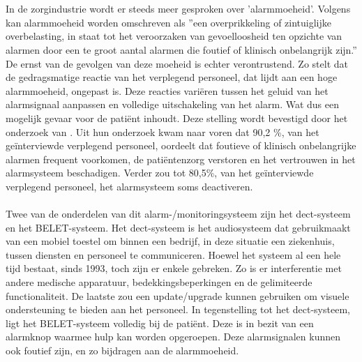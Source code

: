 
\chapter{}%
\label{ch:inleiding}


\section{}%
\label{sec:probleemstelling}

In de zorgindustrie wordt er steeds meer gesproken over 'alarmmoeheid'. Volgens \textcite{Ferrara2023} kan alarmmoeheid worden omschreven als ''een overprikkeling of zintuiglijke overbelasting, in staat tot het veroorzaken van gevoelloosheid ten opzichte van alarmen door een te groot aantal alarmen die foutief of klinisch onbelangrijk zijn.'' De ernst van de gevolgen van deze moeheid is echter verontrustend. Zo stelt \textcite{Ferrara2023} dat de gedragsmatige reactie van het verplegend personeel, dat lijdt aan een hoge alarmmoeheid, ongepast is. Deze reacties variëren tussen het geluid van het alarmsignaal aanpassen en volledige uitschakeling van het alarm. Wat dus een mogelijk gevaar voor de patiënt inhoudt. Deze stelling wordt bevestigd door het onderzoek van \textcite{Casey2018}. Uit hun onderzoek kwam naar voren dat 90,2 \%, van het geïnterviewde verplegend personeel, oordeelt dat foutieve of klinisch onbelangrijke alarmen frequent voorkomen, de patiëntenzorg verstoren en het vertrouwen in het alarmsysteem beschadigen. Verder zou tot 80,5\%, van het geïnterviewde verplegend personeel, het alarmsysteem soms deactiveren.
\\\\
Twee van de onderdelen van dit alarm-/monitoringsysteem zijn het \gls{dect}-systeem en het BELET-systeem. Het \gls{dect}-systeem is het audiosysteem dat gebruikmaakt van een mobiel toestel om binnen een bedrijf, in deze situatie een ziekenhuis, tussen diensten en personeel te communiceren. Hoewel het systeem al een hele tijd bestaat, sinds 1993, toch zijn er enkele gebreken. Zo is er interferentie met andere medische apparatuur, bedekkingsbeperkingen en de gelimiteerde functionaliteit. De laatste zou een update/upgrade kunnen gebruiken om visuele ondersteuning te bieden aan het personeel.
In tegenstelling tot het \gls{dect}-systeem, ligt het BELET-systeem volledig bij de patiënt. Deze is in bezit van een alarmknop waarmee hulp kan worden opgeroepen. Deze alarmsignalen kunnen ook foutief zijn, en zo bijdragen aan de alarmmoeheid.\\


